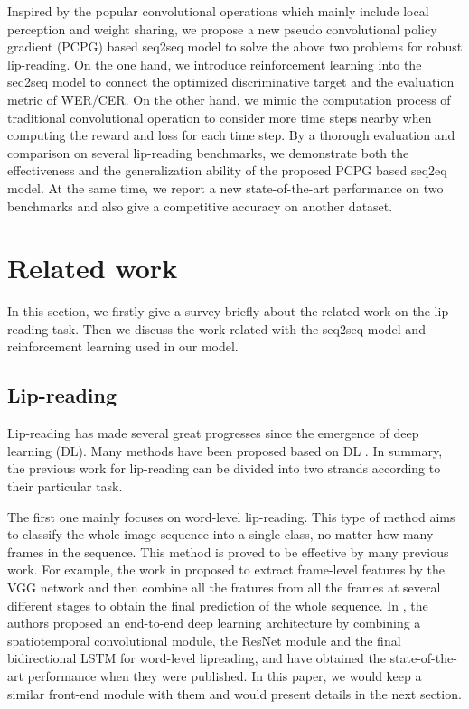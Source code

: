 \documentclass[a4paper, 10pt, conference]{ieeeconf}      %
\begin{document}
	
	Inspired by the popular convolutional operations which mainly include local perception and weight sharing, we propose a new pseudo convolutional policy gradient (PCPG) based seq2seq model to solve the above two problems for robust lip-reading. On the one hand, we introduce reinforcement learning into the seq2seq model to connect the optimized discriminative target and the evaluation metric of WER/CER. On the other hand, we mimic the computation process of traditional convolutional operation to consider more time steps nearby when computing the reward and loss for each time step. By a thorough evaluation and comparison on several lip-reading benchmarks, we demonstrate both the effectiveness and the generalization ability of the proposed PCPG based seq2eq model. At the same time, we report a new state-of-the-art performance on two benchmarks and also give a competitive accuracy on another dataset.
	
	\section{Related work}
	In this section, we firstly give a survey briefly about the related work on the lip-reading task. Then we discuss the work related with the seq2seq model and reinforcement learning used in our model.
	\subsection{Lip-reading}
	Lip-reading has made several great progresses since the emergence of deep learning (DL). Many methods have been proposed based on DL \cite{Chung2018, Chung, Chung2017, B2017, Petridis2018, Assael2016, Afouras,Zhou2014, Yang2019, Hu2016}. In summary, the previous work for lip-reading can be divided into two strands according to their particular task. 
	
	The first one mainly focuses on word-level lip-reading. This type of method aims to classify the whole image sequence into a single class, no matter how many frames in the sequence. This method is proved to be effective by many previous work. For example, the work in \cite{Chung2017} proposed to extract frame-level features by the VGG network and then combine all the fratures from all the frames at several different stages to obtain the final prediction of the whole sequence. 
	In \cite{Stafylakis2017},  the authors proposed an end-to-end deep learning architecture by combining a spatiotemporal convolutional module, the ResNet module and the final bidirectional LSTM for word-level lipreading, and have obtained the state-of-the-art performance when they were published. In this paper, we would keep a similar front-end module with them and would present details in the next section. %
	
\end{document}
